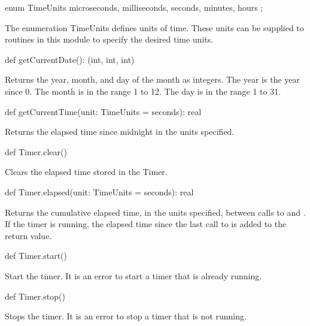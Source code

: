 \begin{protohead}
enum TimeUnits { microseconds, milliseconds, seconds, minutes, hours };
\end{protohead}
\begin{protobody}
The enumeration TimeUnits defines units of time.  These units can be
supplied to routines in this module to specify the desired time units.
\end{protobody}

\begin{protohead}
def getCurrentDate(): (int, int, int)
\end{protohead}
\begin{protobody}
Returns the year, month, and day of the month as integers.  The year
is the year since 0.  The month is in the range 1 to 12.  The day is
in the range 1 to 31.
\end{protobody}

\begin{protohead}
def getCurrentTime(unit: TimeUnits = seconds): real
\end{protohead}
\begin{protobody}
Returns the elapsed time since midnight in the units specified.
\end{protobody}

\begin{protohead}
def Timer.clear()
\end{protohead}
\begin{protobody}
Clears the elapsed time stored in the Timer.
\end{protobody}

\begin{protohead}
def Timer.elapsed(unit: TimeUnits = seconds): real
\end{protohead}
\begin{protobody}
Returns the cumulative elapsed time, in the units specified, between
calls to  and .  If the timer is running, the
elapsed time since the last call to  is added to the
return value.
\end{protobody}

\begin{protohead}
def Timer.start()
\end{protohead}
\begin{protobody}
Start the timer.  It is an error to start a timer that is already
running.
\end{protobody}

\begin{protohead}
def Timer.stop()
\end{protohead}
\begin{protobody}
Stops the timer.  It is an error to stop a timer that is not running.
\end{protobody}
